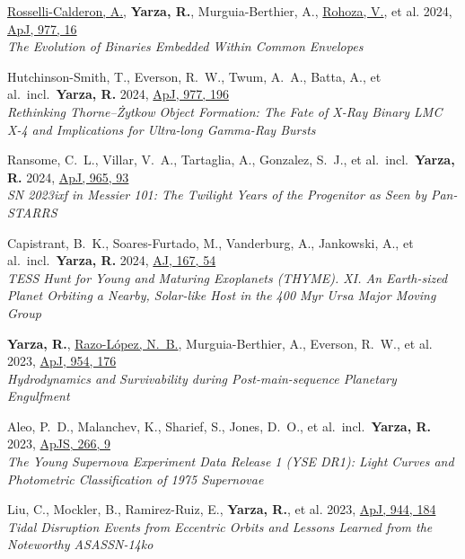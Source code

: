 \item \underline{Rosselli-Calderon, A.}, \textbf{Yarza, R.}, Murguia-Berthier, A., \underline{Rohoza, V.}, et al. 2024, \href{https://ui.adsabs.harvard.edu/abs/2024ApJ...977...16R}{ApJ, 977, 16}\\\textit{The Evolution of Binaries Embedded Within Common Envelopes}

\item Hutchinson-Smith, T., Everson, R.~W., Twum, A.~A., Batta, A., et al.\ incl.\ \textbf{Yarza, R.} 2024, \href{https://ui.adsabs.harvard.edu/abs/2024ApJ...977..196H}{ApJ, 977, 196}\\\textit{Rethinking Thorne--\.{Z}ytkow Object Formation: The Fate of X-Ray Binary LMC X-4 and Implications for Ultra-long Gamma-Ray Bursts}

\item Ransome, C.~L., Villar, V.~A., Tartaglia, A., Gonzalez, S.~J., et al.\ incl.\ \textbf{Yarza, R.} 2024, \href{https://ui.adsabs.harvard.edu/abs/2024ApJ...965...93R}{ApJ, 965, 93}\\\textit{SN 2023ixf in Messier 101: The Twilight Years of the Progenitor as Seen by Pan-STARRS}

\item Capistrant, B.~K., Soares-Furtado, M., Vanderburg, A., Jankowski, A., et al.\ incl.\ \textbf{Yarza, R.} 2024, \href{https://ui.adsabs.harvard.edu/abs/2024AJ....167...54C}{AJ, 167, 54}\\\textit{TESS Hunt for Young and Maturing Exoplanets (THYME). XI\@. An Earth-sized Planet Orbiting a Nearby, Solar-like Host in the 400 Myr Ursa Major Moving Group}

\item \textbf{Yarza, R.}, \underline{Razo-López, N.~B.}, Murguia-Berthier, A., Everson, R.~W., et al. 2023, \href{https://ui.adsabs.harvard.edu/abs/2023ApJ...954..176Y}{ApJ, 954, 176}\\\textit{Hydrodynamics and Survivability during Post-main-sequence Planetary Engulfment}

\item Aleo, P.~D., Malanchev, K., Sharief, S., Jones, D.~O., et al.\ incl.\ \textbf{Yarza, R.} 2023, \href{https://ui.adsabs.harvard.edu/abs/2023ApJS..266....9A}{ApJS, 266, 9}\\\textit{The Young Supernova Experiment Data Release 1 (YSE DR1): Light Curves and Photometric Classification of 1975 Supernovae}

\item Liu, C., Mockler, B., Ramirez-Ruiz, E., \textbf{Yarza, R.}, et al. 2023, \href{https://ui.adsabs.harvard.edu/abs/2023ApJ...944..184L}{ApJ, 944, 184}\\\textit{Tidal Disruption Events from Eccentric Orbits and Lessons Learned from the Noteworthy ASASSN-14ko}

